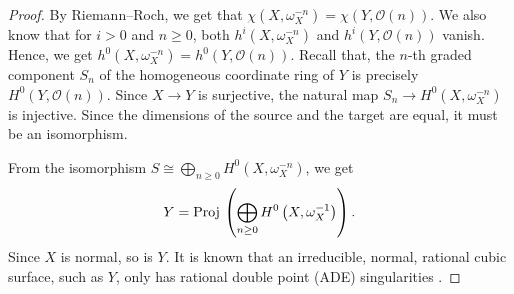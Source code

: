 \documentclass[12pt,reqno]{amsart}
\renewcommand{\to}{{\longrightarrow}}
\numberwithin{equation}{section}
\renewcommand{\O}{\mathcal O}
\newcommand{\Proj}{{\text{\rm Proj}\,}}
\begin{document}
\begin{proof}
  By Riemann--Roch, we get that $\chi(X,\omega_X^{-n}) = \chi(Y, \O(n))$.
  We also know that for $i > 0$ and $n \geq 0$, both $h^i(X, \omega_X^{-n})$ and $h^i(Y, \O(n))$ vanish.
  Hence, we get $h^0(X, \omega_X^{-n}) = h^0(Y, \O(n))$.
  Recall that, the $n$-th graded component $S_n$ of the homogeneous coordinate ring of $Y$ is precisely $H^0(Y, \O(n))$.
  Since $X \to Y$ is surjective, the natural map $S_n \to H^0(X, \omega_X^{-n})$ is injective.
  Since the dimensions of the source and the target are equal, it must be an isomorphism.

  From the isomorphism $S \cong \bigoplus_{n \geq 0} H^0(X, \omega_X^{-n})$, we get
  \[ Y = \Proj\left( \bigoplus_{n \geq 0}H^0\left(X, \omega_X^{-1} \right) \right).\]
  Since $X$ is normal, so is $Y$.
  It is known that an irreducible, normal, rational cubic surface, such as $Y$, only has rational double point (ADE) singularities \cite{bru.wal:79}.
\end{proof}
\end{document}
